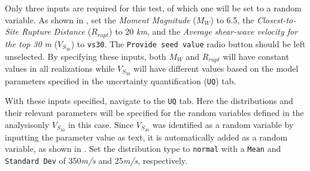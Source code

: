 Only three inputs are required for this test, of which one will be set
to a random variable. As shown in , set the
\emph{Moment Magnitude} ($M_W$) to 6.5, the \emph{Closest-to-Site Rupture Distance}
($R_{rupt}$) to 20 \textit{km}, and the \emph{Average shear-wave velocity
for the top 30 \textit{m}} ($V_{S_{30}}$)
to \texttt{vs30}. The \texttt{Provide seed value} radio button should
be left unselected. By specifying these inputs, both $M_{W}$ and $R_{rupt}$
will have constant values in all realizations while $V_{S_{30}}$ will
have different values based on the model parameters specified in the
uncertainty quantification (\texttt{UQ}) tab.

With these inputs specified, navigate to the \texttt{UQ} tab. Here the
distributions and their relevant parameters will be specified for the
random variables defined in the analysis\textemdash only $V_{S_{30}}$
in this case. Since $V_{S_{30}}$ was identified as a random variable
by inputting the parameter value as text, it is automatically added as
a random variable, as shown in . Set the
distribution type to \texttt{normal} with a \texttt{Mean}
and \texttt{Standard Dev} of 350\textit{m/s} and 25\textit{m/s},
respectively.


